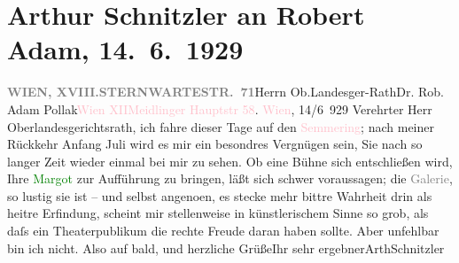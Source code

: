 

               \section[Arthur Schnitzler an Robert Adam, 14. 6. 1929]{ Arthur Schnitzler an Robert Adam, 14. 6. 1929}\nopagebreak{}\rehead{ }\normalsize\beginnumbering{} \toendnotes[C]{\smallbreak\pagebreak[2]} 
\toendnotes[C]{\smallbreak}\pstart{}{\pb}\label{T_L02512-1v}\label{T_L02512-1h}\pend{}\pstart{}\textcolor{pink}{\textcolor{gray}{\textbf{WIEN, XVIII.}}}{}\ledrightnote{\textcolor{pink}{XVIII., Währing}}\pend{}\pstart{}\textcolor{pink}{\textcolor{gray}{\textbf{STERNWARTESTR. 71}}}{}\ledrightnote{\textcolor{pink}{Sternwartestraße}}\pend{}{\bigskip}\pstart{}{\pb}Herrn Ob.Landesger-Rath\pend{}\pstart{}Dr. Rob. Adam Pollak\pend{}\pstart{}\textcolor{pink}{Wien XII}{}\ledrightnote{\textcolor{pink}{XII., Meidling}}\pend{}\pstart{}\textcolor{pink}{Meidlinger Hauptstr 58}{}\ledrightnote{\textcolor{pink}{Meidlinger Hauptstraße}}.\pend{}{\bigskip}\pstart
           \raggedleft{}{\pb}\textcolor{pink}{Wien}{}\ledrightnote{\textcolor{pink}{Wien}}, 14/6 929\pend
           \pstart{}Verehrter Herr Oberlandesgerichtsrath,\pend\pstart
           ich fahre dieser Tage auf den \textcolor{pink}{Semmering}{}\ledrightnote{\textcolor{pink}{Semmering}}; nach
                    meiner Rückkehr Anfang Juli wird es mir ein besondres Vergnügen
                    sein, Sie nach so langer Zeit wieder einmal bei mir zu sehen. Ob eine Bühne sich
                    entschließen wird, Ihre \textcolor{green}{Margot}{}\ledrightnote{\textcolor{green}{Margot und das Jugendgericht}} zur Aufführung
                    zu bringen, läßt sich schwer voraussagen; die \textcolor{gray}{Galerie}, so
                    lustig sie ist – und selbst angeno{\geminationm}en, es stecke
                    mehr bittre Wahrheit drin als heitre Erfindung, scheint mir stellenweise in
                    künstlerischem Sinne so grob, als daſs ein Theaterpublikum die rechte Freude
                    daran haben sollte.\pend
           \pstart Aber unfehlbar bin ich nicht. Also auf bald, und herzliche Grüße\hspace*{1.5em}Ihr sehr ergebner\spacefill\mbox{ArthSchnitzler}\pend{}\endnumbering{}  
      